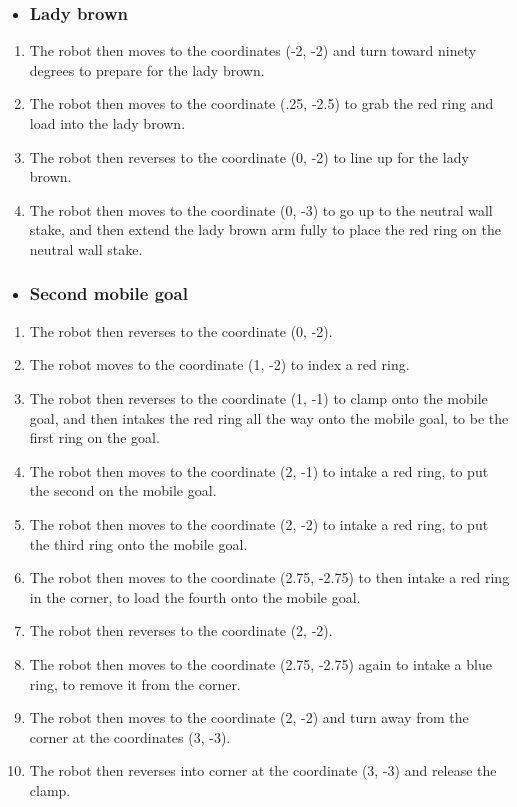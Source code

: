    \begin{itemize}
       \item \subsubsection{Lady brown}
   \end{itemize}
\begin{enumerate}
    \item The robot then moves to the coordinates (-2, -2) and turn toward ninety degrees to prepare for the lady brown.
    \item  The robot then moves to the coordinate (.25, -2.5) to grab the red ring and load into the lady brown. 
    \item The robot then reverses to the coordinate (0, -2) to line up for the lady brown.
    \item   The robot then moves to the coordinate (0, -3) to go up to the neutral wall stake, and then extend the lady brown arm fully to place the red ring on the neutral wall stake. 
\end{enumerate}
\begin{itemize}
    \item \subsubsection{Second mobile goal}
\end{itemize}
\begin{enumerate}
    \item The robot then reverses to the coordinate (0, -2).
    \item The robot moves to the coordinate (1, -2) to index a red ring. 
    \item The robot then reverses to the coordinate (1, -1) to clamp onto the mobile goal, and then intakes the red ring all the way onto the mobile goal, to be the first ring on the goal.
    \item The robot then moves to the coordinate (2, -1) to intake a red ring, to put the second on the mobile goal.
    \item The robot then moves to the coordinate (2, -2) to intake a red ring, to put the third ring onto the mobile goal. 
    \item The robot then moves to the coordinate (2.75, -2.75) to then intake a red ring in the corner, to load the fourth onto the mobile goal.
    \item The robot then reverses to the coordinate (2, -2).
    \item The robot then moves to the coordinate (2.75, -2.75) again to intake a blue ring, to remove it from the corner.
    \item The robot then moves to the coordinate (2, -2) and turn away from the corner at the coordinates (3, -3). 
    \item   The robot then reverses into corner at the coordinate (3, -3) and release the clamp.
\end{enumerate}
